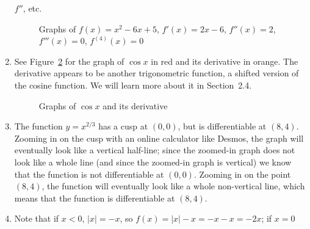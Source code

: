 \documentclass{article}
\begin{document}
\begin{enumerate}
  \(f''\), etc.
  \begin{figure}[htbp]
    \centering
    \caption{Graphs of $f(x)=x^2-6x+5$, $f'(x)=2x-6$, $f''(x)=2$,
      $f'''(x)=0$, $f^{(4)}(x)=0$}
    \label{fig:x2-6x+5}
  \end{figure}
\item See Figure~\ref{fig:cosx} for the graph of $\cos x$ in red and
  its derivative in orange.  The derivative appears to be another
  trigonometric function, a shifted version of the cosine function.
  We will learn more about it in Section~2.4.
  \begin{figure}[htbp]
    \centering
    \caption{Graphs of $\cos x$ and its derivative}
    \label{fig:cosx}
  \end{figure}
\item The function $y=x^{2/3}$ has a cusp at $(0,0)$, but is
  differentiable at $(8,4)$.  Zooming in on the cusp with an online
  calculator like Desmos, the graph will eventually look like a
  vertical half-line; since the zoomed-in graph does not look like a
  whole line (and since the zoomed-in graph is vertical) we know that
  the function is not differentiable at \((0,0)\).  Zooming in on the
  point \((8,4)\), the function will eventually look like a whole
  non-vertical line, which means that the function is differentiable
  at \((8,4)\).
\item\label{prob:absx-xprime}
  Note that if $x<0$, $|x|=-x$, so $f(x)=|x|-x=-x-x=-2x$; if $x=0$

\end{enumerate}
\end{document}
